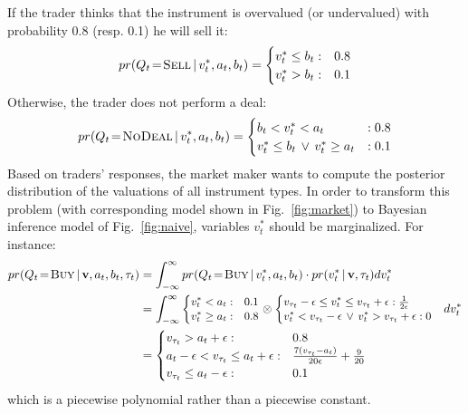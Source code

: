 {\begin{equation}
\end{equation}
If the trader thinks that the instrument is overvalued (or undervalued) with probability 0.8 (resp. 0.1) he will sell it:
\begin{equation}
pr ( Q_{t} \!=\! \textsc{Sell} \, | \, v_{t}^* , a_{t}, b_{t}) = 
\begin{cases}
v_{t}^* \leq b_{t} 		: &0.8\\
v_{t}^* > b_{t} 		: &0.1
\end{cases}
\end{equation}
Otherwise, the trader does not perform a deal:
%
\begin{equation}
pr ( Q_{t} \!=\! \textsc{NoDeal} \, | \, v_{t}^*, a_{t}, b_{t}) =
\begin{cases}
b_{t} < v_{t}^* < a_{t} 								 & : 0.8\\
v_{t}^* \leq b_{t} \, \vee\,  v_{t}^* \geq a_{t}	 	 & : 0.1
\end{cases}
\end{equation}
Based on traders' responses, the market maker wants to compute the posterior distribution of the valuations of all instrument types.
In order to transform this problem (with corresponding model shown in Fig.~\ref{fig:market})
to Bayesian inference model of Fig.~\ref{fig:naive}, variables $v_{t}^*$ should be marginalized.
For instance:
\begin{align*}
pr( Q_{t} \! = \! \textsc{Buy} \, | \, \bvec{v}, a_{t}, b_{t}, \tau_t) &= 
\int_{-\infty}^{\infty} pr( Q_{t} \! = \! \textsc{Buy} \, | \, v_{t}^*, a_{t}, b_{t})
\cdot pr (v_{t}^* \, | \, \bvec{v}, \tau_t ) d v_{t}^* \\
&= \int_{-\infty}^{\infty}
{\footnotesize
\begin{cases}
v_{t}^*  		<     a_{t}  : &0.1\\
v_{t}^*  		\geq a_{t}  : &0.8
\end{cases} 
}
\otimes
{\footnotesize
\begin{cases}
v_{\tau_t} - \epsilon \leq v_{t}^* \leq v_{\tau_t} + \epsilon 					: \frac{1}{2 \epsilon} \\
v_{t}^* < v_{\tau_t} - \epsilon \, \vee \, v_{t}^* > v_{\tau_t} + \epsilon 	: 0  
\end{cases}
}
d v_{t}^*\\
&=
\begin{cases}
v_{\tau_t} > a_{t} + \epsilon : &0.8\\
a_{t} - \epsilon < v_{\tau_t} \leq a_{t} + \epsilon: &\frac{7 (v_{\tau_t} - a_{t})}{20 \epsilon} + \frac{9}{20}\\
v_{\tau_t} \leq a_{t} - \epsilon: &0.1
\end{cases}
\end{align*}
which is a piecewise polynomial rather than a piecewise constant.
}%
